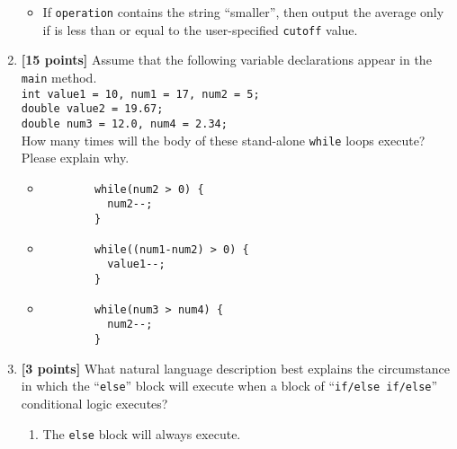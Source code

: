 \begin{enumerate}
\begin{itemize}
  \item If {\tt operation} contains the string ``smaller'', then output the average only if is less than or equal to the
    user-specified {\tt cutoff} value.

\end{itemize}

\vspace{2.5in}

\item {\bf [15 points]}
  Assume that the following variable declarations appear in the {\tt main} method.\\ 

{\tt int value1 = 10, num1 = 17, num2 = 5;}\\
{\tt double value2 = 19.67;}\\
{\tt double num3 = 12.0, num4 = 2.34;}\\ 

\noindent
How many times will the body of these stand-alone {\tt while} loops execute? Please explain why.
 
 \begin{itemize}
 \item
     \begin{verbatim}
        while(num2 > 0) {
          num2--;
        }
     \end{verbatim}
 
 \item 
 \begin{verbatim}
        while((num1-num2) > 0) {
          value1--;
        }
     \end{verbatim}

 \item 
 \begin{verbatim}
        while(num3 > num4) {
          num2--;
        }
     \end{verbatim}

\vspace{0.3in}
 \end{itemize}


\item {\bf [3 points]}
What natural language description best explains the circumstance in which the ``{\tt else}'' block will
execute when a block of ``{\tt if/else if/else}'' conditional logic executes?
\begin{enumerate}
  \item The {\tt else} block will always execute.


\end{enumerate}
\end{enumerate}
